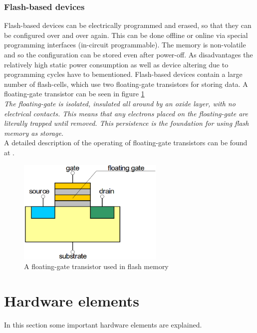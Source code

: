 \subsubsection{Flash-based devices}
Flash-based devices can be electrically programmed and erased, so that they can be configured over and over again. This can be done offline or online via special programming interfaces (in-circuit programmable). The memory is non-volatile and so the configuration can be stored even after power-off. As disadvantages the relatively high static power consumption\cite{Qui16} as well as device altering due to programming cycles have to bementioned. Flash-based devices contain a large number of flash-cells, which use two floating-gate transistors for storing data. A floating-gate transistor can be seen in figure \ref{fig:FlashTransistor}\\
\textit{The floating-gate is isolated, insulated all around by an oxide layer, with no electrical contacts. This means that any electrons placed on the floating-gate are literally trapped until removed. This persistence is the foundation for using flash memory as storage.}\cite{Flash16}\\
A detailed description of the operating of floating-gate transistors can be found at \cite{Cse16}.\\

\begin{figure}[htbp]
\begin{center}
\includegraphics[width=7cm,keepaspectratio=true]{bilder/png/FlashTransistor}
\caption{A floating-gate transistor used in flash memory\cite{Core16}}
\label{fig:FlashTransistor}
\end{center}
\end{figure}
\section{Hardware elements}
In this section some important hardware elements are explained.
